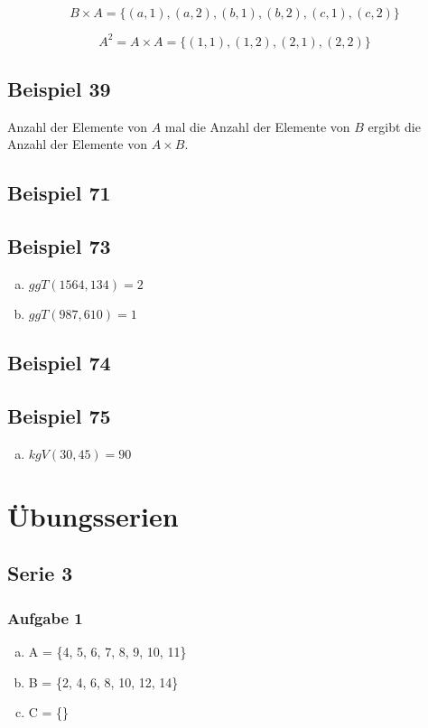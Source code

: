 \documentclass[12pt, a4paper, oneside]{article}
\begin{document}
\begin{equation*}
  B \times A = \{(a, 1), (a, 2), (b, 1), (b, 2), (c, 1), (c, 2)\}
\end{equation*}

\begin{equation*}
  A^{2} = A \times A = \{(1, 1), (1, 2), (2, 1), (2, 2)\}
\end{equation*}

\subsection{Beispiel 39}
Anzahl der Elemente von $A$ mal die Anzahl der Elemente von $B$ ergibt die Anzahl der Elemente von $A \times B$.

\subsection{Beispiel 71}


\subsection{Beispiel 73}
\begin{enumerate}[(a)]
  \item $ggT(1564, 134) = 2$
  \item $ggT(987, 610) = 1$
\end{enumerate}

\subsection{Beispiel 74}

\subsection{Beispiel 75}
\begin{enumerate}[(a)]
  \item $kgV(30, 45) = 90$
\end{enumerate}

\newpage
\section{Übungsserien}
\subsection{Serie 3}
\subsubsection{Aufgabe 1}
\begin{enumerate}[(a)]
  \item A = \{4, 5, 6, 7, 8, 9, 10, 11\}
  \item B = \{2, 4, 6, 8, 10, 12, 14\}
  \item C = \{\}
\end{enumerate}
\end{document}
